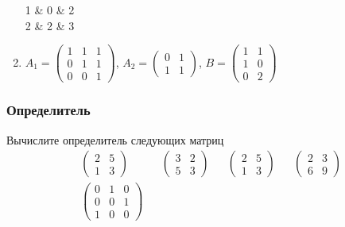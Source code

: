 \begin{exercise}
\begin{enumerate}
\begin{pmatrix}
		1 & 0 & 2 \\ 2 & 2 & 3
	\end{pmatrix}\)
	\item \(A_1=\begin{pmatrix}
		1 & 1 & 1 \\ 0 & 1 & 1 \\ 0 & 0 & 1
	\end{pmatrix}\), \(A_2=\begin{pmatrix}
		0 & 1 \\ 1 & 1
	\end{pmatrix}\), \(B=\begin{pmatrix}
		1 & 1 \\ 1 & 0 \\ 0 & 2
	\end{pmatrix}\)
\end{enumerate}
\end{exercise}

\subsubsection{Определитель}

\begin{exercise}
Вычислите определитель следующих матриц
\begin{align*}
	& \begin{pmatrix}
		2 & 5 \\ 1 & 3
	\end{pmatrix} &
	& \begin{pmatrix}
		3 & 2 \\ 5 & 3
	\end{pmatrix} &
	& \begin{pmatrix}
		2 & 5 \\ 1 & 3
	\end{pmatrix} &
	& \begin{pmatrix}
		2 & 3 \\ 6 & 9
	\end{pmatrix} \\
	& \begin{pmatrix}
		0 & 1 & 0 \\ 0 & 0 & 1 \\ 1 & 0 & 0
	\end{pmatrix}
\end{align*}
\end{exercise}

